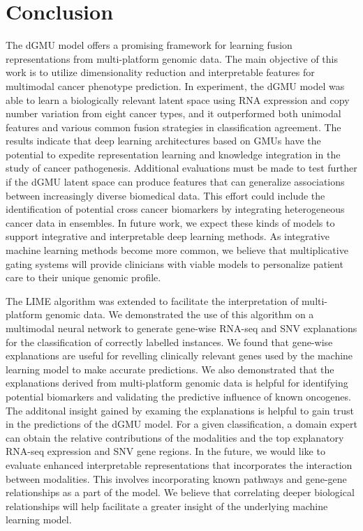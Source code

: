 \chapter{Conclusion} \label{chap:conclusion}

The dGMU model offers a promising framework for learning fusion representations from multi-platform genomic data. The main objective of this work is to utilize dimensionality reduction and interpretable features for multimodal cancer phenotype prediction. In experiment, the dGMU model was able to learn a biologically relevant latent space using RNA expression and copy number variation from eight cancer types, and it outperformed both unimodal features and various common fusion strategies in classification agreement. The results indicate that deep learning architectures based on GMUs have the potential to expedite representation learning and knowledge integration in the study of cancer pathogenesis. Additional evaluations must be made to test further if the dGMU latent space can produce features that can generalize associations between increasingly diverse biomedical data. This effort could include the identification of potential cross cancer biomarkers by integrating heterogeneous cancer data in ensembles. In future work, we expect these kinds of models to support integrative and interpretable deep learning methods. As integrative machine learning methods become more common, we believe that multiplicative gating systems will provide clinicians with viable models to personalize patient care to their unique genomic profile.


The LIME algorithm was extended to facilitate the interpretation of multi-platform genomic data. We demonstrated the use of this algorithm on a multimodal neural network to generate gene-wise RNA-seq and SNV explanations for the classification of correctly labelled instances. We found that gene-wise explanations are useful for revelling clinically relevant genes used by the machine learning model to make accurate predictions. We also demonstrated that the explanations derived from multi-platform genomic data is helpful for identifying potential biomarkers and validating the predictive influence of known oncogenes. The additonal insight gained by examing the explanations is helpful to gain trust in the predictions of the dGMU model. For a given classification, a domain expert can obtain the relative contributions of the modalities and the top explanatory RNA-seq expression and SNV gene regions. In the future, we would like to evaluate enhanced interpretable representations that incorporates the interaction between modalities. This involves incorporating known pathways and gene-gene relationships as a part of the model. We believe that correlating deeper biological relationships will help facilitate a greater insight of the underlying machine learning model.